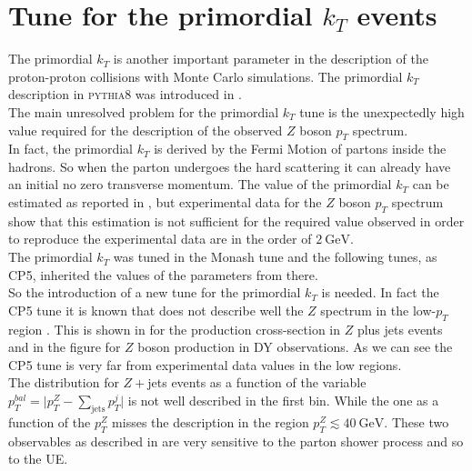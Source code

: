 \chapter{Tune for the primordial $k_T$ events}
\label{chap:primordialkTtune}

The primordial $k_T$ is another important parameter in the description of the proton-proton collisions with Monte Carlo simulations. The primordial $k_T$ description in \textsc{pythia8} was introduced in .
\\
The main unresolved problem for the primordial $k_T$ tune is the unexpectedly high value required for the description of the observed $Z$ boson $p_T$ spectrum.
\\
In fact, the primordial $k_T$ is derived by the Fermi Motion of partons inside the hadrons. So when the parton undergoes the hard scattering it can already have an initial no zero transverse momentum.
The value of the primordial $k_T$ can be estimated as reported in , but experimental data for the $Z$ boson $p_T$ spectrum show that this estimation is not sufficient for the required value observed in order to reproduce the experimental data are in the order of $2\ \mathrm{GeV}$.
\\
%
The primordial $k_T$ was tuned in the Monash tune \cite{Monash} and the following tunes, as CP5, inherited the values of the parameters from there.
\\
So the introduction of a new tune for the primordial $k_T$ is needed. In fact the CP5 tune it is known that does not describe well the $Z$ spectrum in the low-$p_T$ region \cite{CPtunes}. This is shown in  for the production cross-section in $Z$ plus jets events and in the figure  for $Z$ boson production in DY observations. As we can see the CP5 tune is very far from experimental data values in the low regions. 
\\
The distribution for $Z+$jets events as a function of the variable $p_T^{bal}=\big|p_T^Z-\sum_{\text{jets}}p_T^{j}\big|$ is not well described in the first bin. While the one as a function of the $p_T^Z$ misses the description in the region $p_T^Z \lesssim 40\ \mathrm{GeV}$. These two observables as described in \cite{CPtunes} are very sensitive to the parton shower process and so to the UE.
